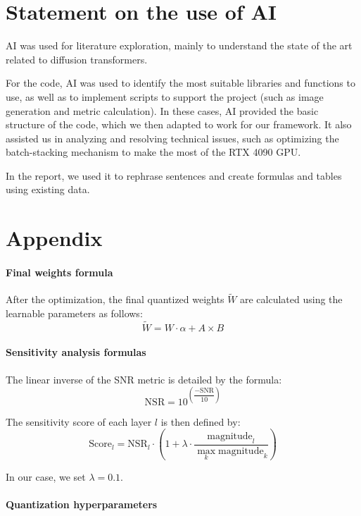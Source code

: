 \documentclass{article}
\begin{document}
\cleardoublepage
\section*{Statement on the use of AI}\label{sec:ai}

AI was used for literature exploration, mainly to understand the state of the art related to diffusion transformers.

For the code, AI was used to identify the most suitable libraries and functions to use, as well as to implement scripts to support the project (such as image generation and metric calculation). In these cases, AI provided the basic structure of the code, which we then adapted to work for our framework. It also assisted us in analyzing and resolving technical issues, such as optimizing the batch-stacking mechanism to make the most of the RTX 4090 GPU.

In the report, we used it to rephrase sentences and create formulas and tables using existing data.






\section*{Appendix}

\paragraph{Final weights formula}

After the optimization, the final quantized weights $\tilde W$ are calculated using the learnable parameters as follows:
\[\tilde W = W \cdot \alpha + A \times B\]


\paragraph{Sensitivity analysis formulas}

The linear inverse of the SNR metric is detailed by the formula:
\[\text{NSR} = 10^{\left(\dfrac{-\text{SNR}}{10}\right)}\]

The sensitivity score of each layer $l$ is then defined by:
\[\text{Score}_{l} = \text{NSR}_{l}\cdot \left(1+\lambda\cdot \frac{\text{magnitude}_{l}}{\displaystyle\max_{k} \text{magnitude}_{k}}\right)\]

In our case, we set $\lambda=0.1$.


\paragraph{Quantization hyperparameters}
\end{document}
